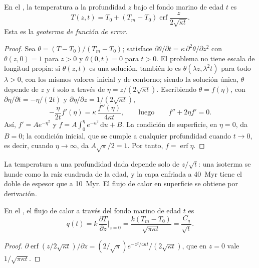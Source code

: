 \begin{theorem}\label{thm:b3:lithosphere-thermal-models:erf}
En el , la temperatura a la profundidad $z$ bajo el
fondo marino de edad $t$ es
\[
  T(z, t) = T_0 + (T_m - T_0)\operatorname{erf}\frac{z}{2\sqrt{\kappa t}} .
\]
Esta es la \emph{geoterma de función de error}.
\end{theorem}

\begin{proof}
Sea $\theta = (T - T_0)/(T_m - T_0)$; satisface $\partial\theta/\partial t =
\kappa\,\partial^2\theta/\partial z^2$ con $\theta(z, 0) = 1$ para $z > 0$ y
$\theta(0, t) = 0$ para $t > 0$. El problema no tiene escala de longitud propia:
si $\theta(z, t)$ es una solución, también lo es $\theta(\lambda z, \lambda^2t)$ para todo
$\lambda > 0$, con los mismos valores inicial y de contorno; siendo la solución
única, $\theta$ depende de $z$ y $t$ solo a través de $\eta = z/(2\sqrt{\kappa
t})$. Escribiendo $\theta = f(\eta)$, con $\partial\eta/\partial t = -\eta/(2t)$ y
$\partial\eta/\partial z = 1/(2\sqrt{\kappa t})$,
\[
  -\frac{\eta}{2t}f'(\eta) = \kappa\,\frac{f''(\eta)}{4\kappa t},
  \qquad\text{luego}\qquad f'' + 2\eta f' = 0 .
\]
Así, $f' = Ae^{-\eta^2}$ y $f = A\int_0^\eta e^{-u^2}\,\mathrm du + B$. La
condición de superficie, en $\eta = 0$, da $B = 0$; la condición inicial, que
se cumple a cualquier profundidad cuando $t \to 0$, es decir, cuando $\eta \to \infty$, da
$A\sqrt\pi/2 = 1$. Por tanto, $f = \operatorname{erf}\eta$.
\end{proof}

La temperatura a una profundidad dada depende solo de $z/\sqrt t$: una isoterma se hunde
como la raíz cuadrada de la edad, y la capa enfriada a \qty{40}{Myr} tiene el doble
de espesor que a \qty{10}{Myr}. El flujo de calor en superficie se obtiene por derivación.

\begin{proposition}\label{prop:b3:lithosphere-thermal-models:heat-flow}
En el , el flujo de calor a través del fondo marino de edad $t$
es
\[
  q(t) = k\,\frac{\partial T}{\partial z}\Big|_{z=0}
  = \frac{k(T_m - T_0)}{\sqrt{\pi\kappa t}} = \frac{C_q}{\sqrt t} .
\]
\end{proposition}

\begin{proof}
$\partial\operatorname{erf}(z/2\sqrt{\kappa t})/\partial z = (2/\sqrt\pi)
e^{-z^2/4\kappa t}/(2\sqrt{\kappa t})$, que en $z = 0$ vale $1/\sqrt{\pi\kappa
t}$.
\end{proof}

